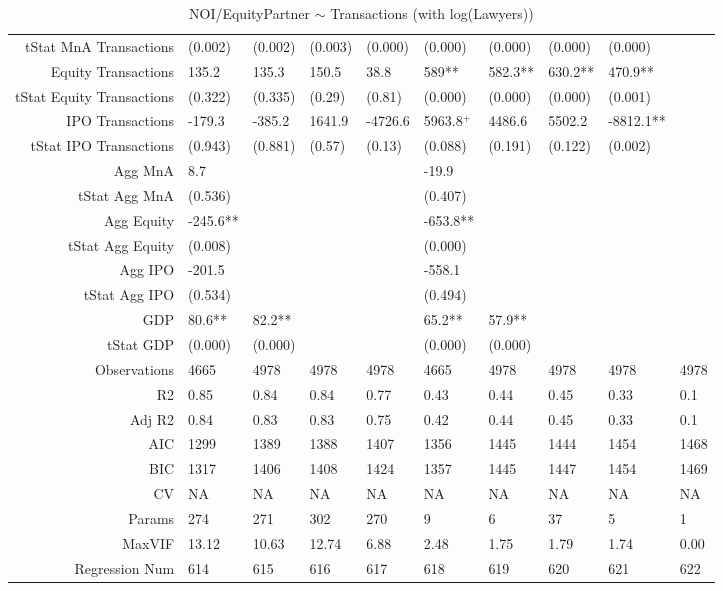 \begin{table}[ht]
\begin{tabular}{rlllllllll}
  tStat MnA Transactions & (0.002) & (0.002) & (0.003) & (0.000) & (0.000) & (0.000) & (0.000) & (0.000) &  \\ 
  Equity Transactions & 135.2 & 135.3 & 150.5 & 38.8 & 589** & 582.3** & 630.2** & 470.9** &  \\ 
  tStat Equity Transactions & (0.322) & (0.335) & (0.29) & (0.81) & (0.000) & (0.000) & (0.000) & (0.001) &  \\ 
  IPO Transactions & -179.3 & -385.2 & 1641.9 & -4726.6 & 5963.8$^{+}$ & 4486.6 & 5502.2 & -8812.1** &  \\ 
  tStat IPO Transactions & (0.943) & (0.881) & (0.57) & (0.13) & (0.088) & (0.191) & (0.122) & (0.002) &  \\ 
  Agg MnA & 8.7 &  &  &  & -19.9 &  &  &  &  \\ 
  tStat Agg MnA & (0.536) &  &  &  & (0.407) &  &  &  &  \\ 
  Agg Equity & -245.6** &  &  &  & -653.8** &  &  &  &  \\ 
  tStat Agg Equity & (0.008) &  &  &  & (0.000) &  &  &  &  \\ 
  Agg IPO & -201.5 &  &  &  & -558.1 &  &  &  &  \\ 
  tStat Agg IPO & (0.534) &  &  &  & (0.494) &  &  &  &  \\ 
  GDP & 80.6** & 82.2** &  &  & 65.2** & 57.9** &  &  &  \\ 
  tStat GDP & (0.000) & (0.000) &  &  & (0.000) & (0.000) &  &  &  \\ 
  Observations & 4665 & 4978 & 4978 & 4978 & 4665 & 4978 & 4978 & 4978 & 4978 \\ 
  R2 & 0.85 & 0.84 & 0.84 & 0.77 & 0.43 & 0.44 & 0.45 & 0.33 & 0.1 \\ 
  Adj R2 & 0.84 & 0.83 & 0.83 & 0.75 & 0.42 & 0.44 & 0.45 & 0.33 & 0.1 \\ 
  AIC & 1299 & 1389 & 1388 & 1407 & 1356 & 1445 & 1444 & 1454 & 1468 \\ 
  BIC & 1317 & 1406 & 1408 & 1424 & 1357 & 1445 & 1447 & 1454 & 1469 \\ 
  CV & NA & NA & NA & NA & NA & NA & NA & NA & NA \\ 
  Params & 274 & 271 & 302 & 270 & 9 & 6 & 37 & 5 & 1 \\ 
  MaxVIF & 13.12 & 10.63 & 12.74 & 6.88 & 2.48 & 1.75 & 1.79 & 1.74 & 0.00 \\ 
  Regression Num & 614 & 615 & 616 & 617 & 618 & 619 & 620 & 621 & 622 \\ 
   \hline
\end{tabular}
\caption{NOI/EquityPartner $\sim$ Transactions (with log(Lawyers))} 
\end{table}

